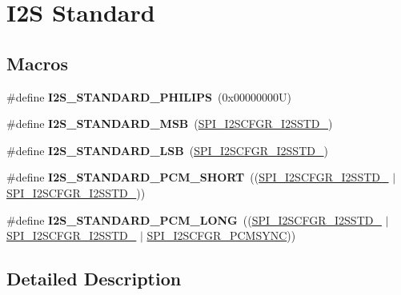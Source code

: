 \hypertarget{group___i2_s___standard}{}\section{I2S Standard}
\label{group___i2_s___standard}
\subsection*{Macros}
\begin{DoxyCompactItemize}
\item 
\mbox{\label{group___i2_s___standard_ga58725c7158549d3852a3acdfe7ac83cc}} 
\#define {\bfseries I2\+S\+\_\+\+S\+T\+A\+N\+D\+A\+R\+D\+\_\+\+P\+H\+I\+L\+I\+PS}~(0x00000000\+U)
\item 
\mbox{\label{group___i2_s___standard_ga1d7e47055dc23008211ed60d0bd59bc3}} 
\#define {\bfseries I2\+S\+\_\+\+S\+T\+A\+N\+D\+A\+R\+D\+\_\+\+M\+SB}~(\hyperlink{group___peripheral___registers___bits___definition_gafeba0a45703463dfe05334364bdacbe8}{S\+P\+I\+\_\+\+I2\+S\+C\+F\+G\+R\+\_\+\+I2\+S\+S\+T\+D\+\_})
\item 
\mbox{\label{group___i2_s___standard_gaa71f6368c1113d02da713994fe735f37}} 
\#define {\bfseries I2\+S\+\_\+\+S\+T\+A\+N\+D\+A\+R\+D\+\_\+\+L\+SB}~(\hyperlink{group___peripheral___registers___bits___definition_ga0142a3667f59bce9bae80d31e88a124a}{S\+P\+I\+\_\+\+I2\+S\+C\+F\+G\+R\+\_\+\+I2\+S\+S\+T\+D\+\_})
\item 
\mbox{\label{group___i2_s___standard_ga2d9b2e3bec0a61f345aed2698720facc}} 
\#define {\bfseries I2\+S\+\_\+\+S\+T\+A\+N\+D\+A\+R\+D\+\_\+\+P\+C\+M\+\_\+\+S\+H\+O\+RT}~((\hyperlink{group___peripheral___registers___bits___definition_gafeba0a45703463dfe05334364bdacbe8}{S\+P\+I\+\_\+\+I2\+S\+C\+F\+G\+R\+\_\+\+I2\+S\+S\+T\+D\+\_} $\vert$ \hyperlink{group___peripheral___registers___bits___definition_ga0142a3667f59bce9bae80d31e88a124a}{S\+P\+I\+\_\+\+I2\+S\+C\+F\+G\+R\+\_\+\+I2\+S\+S\+T\+D\+\_}))
\item 
\mbox{\label{group___i2_s___standard_gae0755adecb5f500d2dfc87f91bd0c9a9}} 
\#define {\bfseries I2\+S\+\_\+\+S\+T\+A\+N\+D\+A\+R\+D\+\_\+\+P\+C\+M\+\_\+\+L\+O\+NG}~((\hyperlink{group___peripheral___registers___bits___definition_gafeba0a45703463dfe05334364bdacbe8}{S\+P\+I\+\_\+\+I2\+S\+C\+F\+G\+R\+\_\+\+I2\+S\+S\+T\+D\+\_} $\vert$ \hyperlink{group___peripheral___registers___bits___definition_ga0142a3667f59bce9bae80d31e88a124a}{S\+P\+I\+\_\+\+I2\+S\+C\+F\+G\+R\+\_\+\+I2\+S\+S\+T\+D\+\_} $\vert$ \hyperlink{group___peripheral___registers___bits___definition_ga66a29efc32a31f903e89b7ddcd20857b}{S\+P\+I\+\_\+\+I2\+S\+C\+F\+G\+R\+\_\+\+P\+C\+M\+S\+Y\+NC}))
\end{DoxyCompactItemize}


\subsection{Detailed Description}
